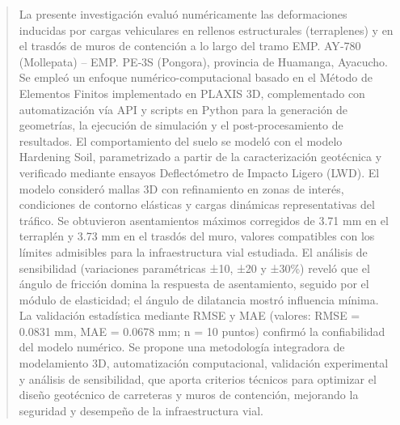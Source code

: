 \begin{quotation}
	\noindent La presente investigación evaluó numéricamente las deformaciones inducidas por cargas vehiculares en rellenos estructurales (terraplenes) y en el trasdós de muros de contención a lo largo del tramo EMP. AY‑780 (Mollepata) – EMP. PE‑3S (Pongora), provincia de Huamanga, Ayacucho. Se empleó un enfoque numérico-computacional basado en el Método de Elementos Finitos implementado en PLAXIS 3D, complementado con automatización vía API y scripts en Python para la generación de geometrías, la ejecución de simulación y el post‑procesamiento de resultados. El comportamiento del suelo se modeló con el modelo Hardening Soil, parametrizado a partir de la caracterización geotécnica y verificado mediante ensayos Deflectómetro de Impacto Ligero (LWD). El modelo consideró mallas 3D con refinamiento en zonas de interés, condiciones de contorno elásticas y cargas dinámicas representativas del tráfico. Se obtuvieron asentamientos máximos corregidos de 3.71 mm en el terraplén y 3.73 mm en el trasdós del muro, valores compatibles con los límites admisibles para la infraestructura vial estudiada. El análisis de sensibilidad (variaciones paramétricas ±10, ±20 y ±30\%) reveló que el ángulo de fricción domina la respuesta de asentamiento, seguido por el módulo de elasticidad; el ángulo de dilatancia mostró influencia mínima. La validación estadística mediante RMSE y MAE (valores: RMSE = 0.0831 mm, MAE = 0.0678 mm; n = 10 puntos) confirmó la confiabilidad del modelo numérico. Se propone una metodología integradora de modelamiento 3D, automatización computacional, validación experimental y análisis de sensibilidad, que aporta criterios técnicos para optimizar el diseño geotécnico de carreteras y muros de contención, mejorando la seguridad y desempeño de la infraestructura vial.
	
	
	
	

\end{quotation}
